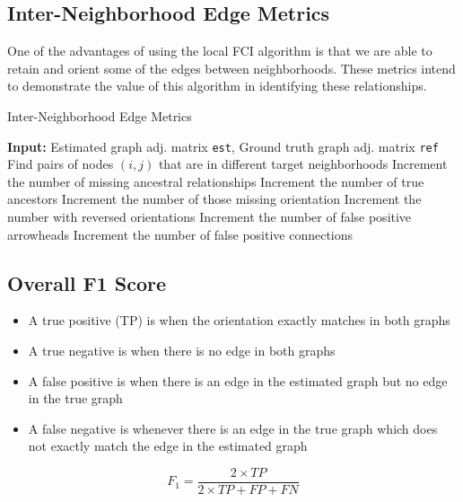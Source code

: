\documentclass[12pt]{article}\usepackage[]{graphicx}\usepackage[]{xcolor}
\begin{document}
\subsection*{Inter-Neighborhood Edge Metrics}

One of the advantages of using the local FCI algorithm is that we are able to retain and orient some of the edges between neighborhoods. These metrics intend to demonstrate the value of this algorithm in identifying these relationships.

\begin{algorithm}[H]
\footnotesize
\caption{Inter-Neighborhood Edge Metrics}
\begin{algorithmic}[1]
\State \textbf{Input:} Estimated graph adj. matrix \texttt{est}, Ground truth graph adj. matrix \texttt{ref}
\State Find pairs of nodes $(i,j)$ that are in different target neighborhoods
\State Increment the number of missing ancestral relationships
\EndIf
\Else
{}
\State Increment the number of true ancestors
\State Increment the number of those missing orientation
\State Increment the number with reversed orientations
\State Increment the number of false positive arrowheads
\Else 
\State Increment the number of false positive connections
\EndIf
\EndIf
\end{algorithmic}
\end{algorithm}

\subsection*{Overall F1 Score}
\begin{itemize}
\item A true positive (TP) is when the orientation exactly matches in both graphs
\item A true negative is when there is no edge in both graphs
\item A false positive is when there is an edge in the estimated graph but no edge in the true graph
\item A false negative is whenever there is an edge in the true graph which does not exactly match the edge in the estimated graph
\end{itemize}

$$ F_1 = \frac{2\times TP}{2\times TP + FP + FN} $$
\end{document}
